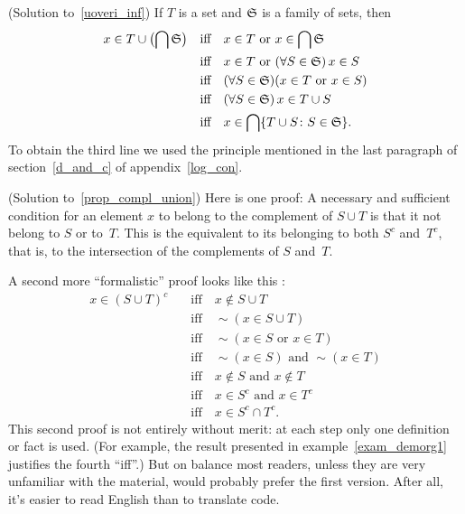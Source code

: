 \begin{prf}\label{sol_uoveri_inf}(Solution to~\ref{uoveri_inf})
If $T$ is a set and $\mathfrak{S}$ is a family of sets, then
 \begin{align*}
   x \in T \cup \bigl(\bigcap\mathfrak{S}\bigr) \quad
       &\text{iff} \quad x \in T \text{ or } x \in \bigcap\mathfrak{S} \\
       &\text{iff} \quad x \in T \text{ or }
              (\forall S \in \mathfrak{S})\, x \in S \\
       &\text{iff} \quad (\forall S \in \mathfrak{S})(x \in T
               \text{ or } x \in S) \\
       &\text{iff} \quad (\forall S \in \mathfrak{S})\, x \in T \cup S \\
       &\text{iff} \quad x \in \bigcap\{T \cup S\colon S \in \mathfrak{S}\}.
 \end{align*}
To obtain the third line we used the principle mentioned in the last paragraph of
section~\ref{d_and_c} of appendix~\ref{log_con}.
\end{prf}

\begin{prf}\label{sol_prop_compl_union}(Solution to~\ref{prop_compl_union})
Here is one proof: A necessary and sufficient condition for an element $x$ to belong to the
complement of $S \cup T$ is that it not belong to $S$ or to~$T$. This is the equivalent to its
belonging to both $S^c$ and~$T^c$, that is, to the intersection of the complements of $S$
and~$T$.

A second more ``formalistic'' proof looks like this :
 \begin{align*}
   x \in (S \cup T)^c  \quad
             &\text{iff} \quad  x \notin S \cup T \\
             &\text{iff} \quad  \sim(x \in S \cup T) \\
             &\text{iff} \quad  \sim(x \in S \text{ or }
                                       x \in T) \\
             &\text{iff} \quad  \sim(x \in S) \text{ and }
                                       \sim(x \in T) \\
             &\text{iff} \quad  x \notin S \text{ and }
                                       x \notin T \\
             &\text{iff} \quad  x \in S^c \text{ and }
                                       x \in T^c \\
             &\text{iff} \quad  x \in S^c \cap T^c.
 \end{align*}
This second proof is not entirely without merit: at each step only one definition or fact is
used.  (For example, the result presented in example~\ref{exam_demorg1} justifies the fourth
``iff''.)  But on balance most readers, unless they are very unfamiliar with the material,
would probably prefer the first version.  After all, it's easier to read English than to
translate code.
\end{prf}

